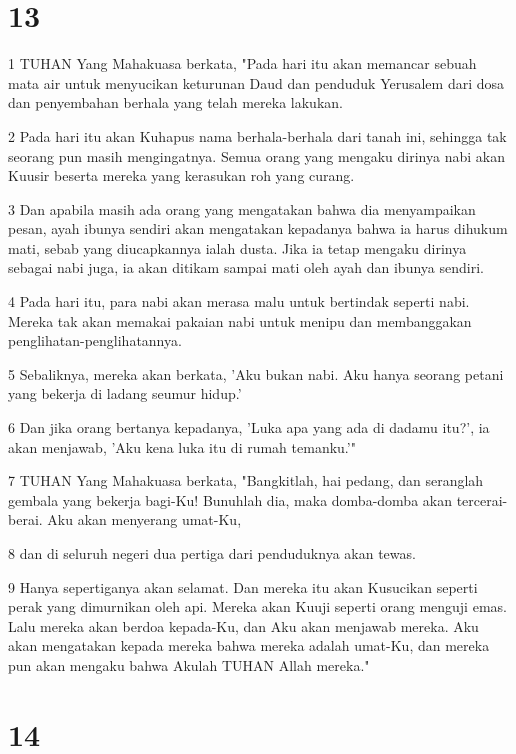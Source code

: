 \chapter{13}

\par 1 TUHAN Yang Mahakuasa berkata, "Pada hari itu akan memancar sebuah mata air untuk menyucikan keturunan Daud dan penduduk Yerusalem dari dosa dan penyembahan berhala yang telah mereka lakukan.
\par 2 Pada hari itu akan Kuhapus nama berhala-berhala dari tanah ini, sehingga tak seorang pun masih mengingatnya. Semua orang yang mengaku dirinya nabi akan Kuusir beserta mereka yang kerasukan roh yang curang.
\par 3 Dan apabila masih ada orang yang mengatakan bahwa dia menyampaikan pesan, ayah ibunya sendiri akan mengatakan kepadanya bahwa ia harus dihukum mati, sebab yang diucapkannya ialah dusta. Jika ia tetap mengaku dirinya sebagai nabi juga, ia akan ditikam sampai mati oleh ayah dan ibunya sendiri.
\par 4 Pada hari itu, para nabi akan merasa malu untuk bertindak seperti nabi. Mereka tak akan memakai pakaian nabi untuk menipu dan membanggakan penglihatan-penglihatannya.
\par 5 Sebaliknya, mereka akan berkata, 'Aku bukan nabi. Aku hanya seorang petani yang bekerja di ladang seumur hidup.'
\par 6 Dan jika orang bertanya kepadanya, 'Luka apa yang ada di dadamu itu?', ia akan menjawab, 'Aku kena luka itu di rumah temanku.'"
\par 7 TUHAN Yang Mahakuasa berkata, "Bangkitlah, hai pedang, dan seranglah gembala yang bekerja bagi-Ku! Bunuhlah dia, maka domba-domba akan tercerai-berai. Aku akan menyerang umat-Ku,
\par 8 dan di seluruh negeri dua pertiga dari penduduknya akan tewas.
\par 9 Hanya sepertiganya akan selamat. Dan mereka itu akan Kusucikan seperti perak yang dimurnikan oleh api. Mereka akan Kuuji seperti orang menguji emas. Lalu mereka akan berdoa kepada-Ku, dan Aku akan menjawab mereka. Aku akan mengatakan kepada mereka bahwa mereka adalah umat-Ku, dan mereka pun akan mengaku bahwa Akulah TUHAN Allah mereka."

\chapter{14}

